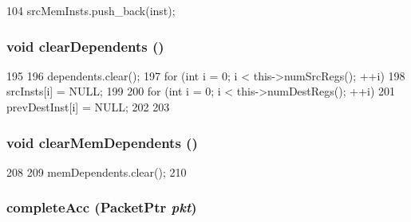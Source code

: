 \begin{DoxyCode}
104 { srcMemInsts.push_back(inst); }
\end{DoxyCode}
\hypertarget{classOzoneDynInst_a11c8fa620d042e357345e77882547d89}{
\subsubsection[{clearDependents}]{\setlength{\rightskip}{0pt plus 5cm}void clearDependents ()}}
\label{classOzoneDynInst_a11c8fa620d042e357345e77882547d89}



\begin{DoxyCode}
195 {
196     dependents.clear();
197     for (int i = 0; i < this->numSrcRegs(); ++i) {
198         srcInsts[i] = NULL;
199     }
200     for (int i = 0; i < this->numDestRegs(); ++i) {
201         prevDestInst[i] = NULL;
202     }
203 }
\end{DoxyCode}
\hypertarget{classOzoneDynInst_a9a80912db66a6c9811bc79e97ab063f8}{
\subsubsection[{clearMemDependents}]{\setlength{\rightskip}{0pt plus 5cm}void clearMemDependents ()}}
\label{classOzoneDynInst_a9a80912db66a6c9811bc79e97ab063f8}



\begin{DoxyCode}
208 {
209     memDependents.clear();
210 }
\end{DoxyCode}
\hypertarget{classOzoneDynInst_ae3a7c08c75c0a49df5adfb7d43996e12}{
\subsubsection[{completeAcc}]{ completeAcc ({\bf PacketPtr} {\em pkt})}}
\label{classOzoneDynInst_ae3a7c08c75c0a49df5adfb7d43996e12}



